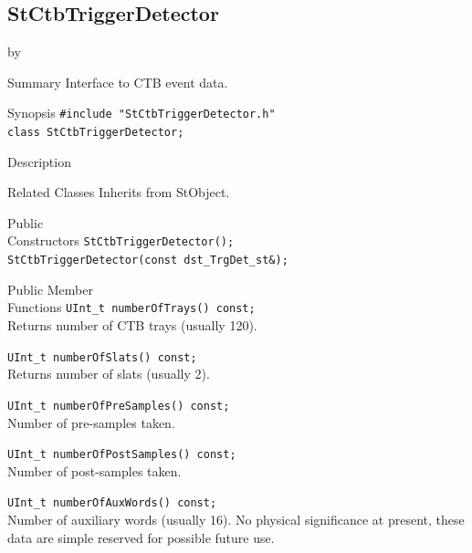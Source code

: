 \documentclass[twoside]{article}
\newcommand{\entrylabel}[1]{\mbox{\textbf{{#1}}}\hfil}%
\newenvironment{entry}
{\begin{list}{}%
    {\renewcommand{\makelabel}{\entrylabel}%
     \setlength{\labelwidth}{90pt}%
     \setlength{\leftmargin}{\labelwidth}
     \advance\leftmargin by \labelsep%
      }%
    }%
  {\end{list}}
\newcommand{\Entrylabel}[1]%
{\raisebox{0pt}[1ex][0pt]{\makebox[\labelwidth][l]%
    {\parbox[t]{\labelwidth}{\hspace{0pt}\textbf{{#1}}}}}}
\newenvironment{Entry}%
{\renewcommand{\entrylabel}{\Entrylabel}\begin{entry}}%
  {\end{entry}}
\begin{document}
\subsection{StCtbTriggerDetector}
\label{sec:StCtbTriggerDetector}
\begin{Entry}
\item[Summary] Interface to CTB event data.
    
\item[Synopsis]
    \verb+#include "StCtbTriggerDetector.h"+\\
    \verb+class StCtbTriggerDetector;+\\
\item[Description]
    
\item[Related Classes]
    Inherits from StObject.
    
\item[Public\\ Constructors]
    \verb+StCtbTriggerDetector();+\\
    \verb+StCtbTriggerDetector(const dst_TrgDet_st&);+\\
    
\item[Public Member\\ Functions]
    \verb+UInt_t numberOfTrays() const;+\\
    Returns number of CTB trays (usually 120).
    
    \verb+UInt_t numberOfSlats() const;+\\
    Returns number of slats (usually 2).
    
    \verb+UInt_t numberOfPreSamples() const;+\\
    Number of pre-samples taken.
    
    \verb+UInt_t numberOfPostSamples() const;+\\
    Number of post-samples taken.
    
    \verb+UInt_t numberOfAuxWords() const;+\\
    Number of auxiliary words (usually 16).  No physical significance
    at present, these data are simple reserved for possible future
    use.
    

\end{Entry}
\end{document}
